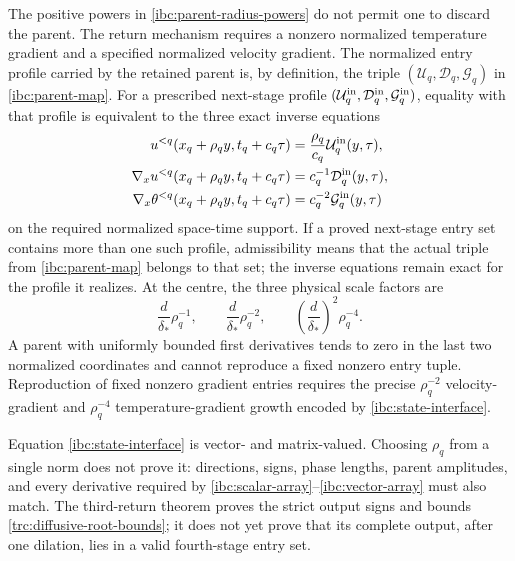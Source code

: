 The positive powers in \eqref{ibc:parent-radius-powers} do not permit one
to discard the parent.  The return mechanism requires a nonzero normalized
temperature gradient and a specified normalized velocity gradient.  The
normalized entry profile carried by the retained parent is, by definition,
the triple $(\mathcal U_q,\mathcal D_q,\mathcal G_q)$ in
\eqref{ibc:parent-map}.  For a prescribed next-stage profile
$(\mathcal U_q^{\rm in},\mathcal D_q^{\rm in},
\mathcal G_q^{\rm in})$, equality with that profile is equivalent to the
three exact inverse equations
\begin{equation}\label{ibc:state-interface}
 \begin{aligned}
 u^{<q}(x_q+\rho_qy,t_q+c_q\tau)
    &=\frac{\rho_q}{c_q}\mathcal U_q^{\rm in}(y,\tau),\\
 \nabla_xu^{<q}(x_q+\rho_qy,t_q+c_q\tau)
    &=c_q^{-1}\mathcal D_q^{\rm in}(y,\tau),\\
 \nabla_x\theta^{<q}(x_q+\rho_qy,t_q+c_q\tau)
    &=c_q^{-2}\mathcal G_q^{\rm in}(y,\tau)
 \end{aligned}
\end{equation}
on the required normalized space-time support.  If a proved next-stage entry
set contains more than one such profile, admissibility means that the actual
triple from \eqref{ibc:parent-map} belongs to that set; the inverse equations
remain exact for the profile it realizes.  At the centre, the three physical
scale factors are
\begin{equation}\label{ibc:state-powers}
 \frac d{\delta_*}\rho_q^{-1},\qquad
 \frac d{\delta_*}\rho_q^{-2},\qquad
 \left(\frac d{\delta_*}\right)^2\rho_q^{-4}.
\end{equation}
A parent with uniformly bounded first derivatives tends to zero in the last
two normalized coordinates and cannot reproduce a fixed nonzero entry tuple.
Reproduction of fixed nonzero gradient entries requires the precise
$\rho_q^{-2}$ velocity-gradient and $\rho_q^{-4}$ temperature-gradient
growth encoded by \eqref{ibc:state-interface}.

Equation \eqref{ibc:state-interface} is vector- and matrix-valued.  Choosing
$\rho_q$ from a single norm does not prove it: directions, signs, phase
lengths, parent amplitudes, and every derivative required by
\eqref{ibc:scalar-array}--\eqref{ibc:vector-array} must also match.  The
third-return theorem proves the strict output signs and bounds
\eqref{trc:diffusive-root-bounds}; it does not yet prove that its complete
output, after one dilation, lies in a valid fourth-stage entry set.

